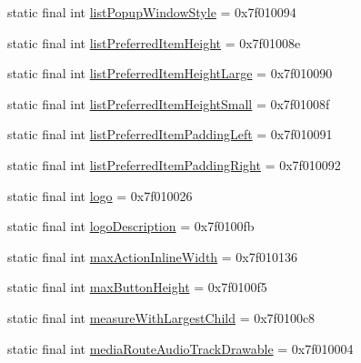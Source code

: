 \begin{CompactItemize}
\item 
static final int \hyperlink{classandroid_1_1support_1_1graphics_1_1drawable_1_1animated_1_1_r_1_1attr_6b8d717596e28632dd77aa2eae804b9a}{listPopupWindowStyle} = 0x7f010094
\item 
static final int \hyperlink{classandroid_1_1support_1_1graphics_1_1drawable_1_1animated_1_1_r_1_1attr_98494be82701302ec81859baf11b7b7b}{listPreferredItemHeight} = 0x7f01008e
\item 
static final int \hyperlink{classandroid_1_1support_1_1graphics_1_1drawable_1_1animated_1_1_r_1_1attr_2771648aa61ad82dc9efb993be87dac1}{listPreferredItemHeightLarge} = 0x7f010090
\item 
static final int \hyperlink{classandroid_1_1support_1_1graphics_1_1drawable_1_1animated_1_1_r_1_1attr_7ee5ac7b3aa22c552ed6161e5c567f4c}{listPreferredItemHeightSmall} = 0x7f01008f
\item 
static final int \hyperlink{classandroid_1_1support_1_1graphics_1_1drawable_1_1animated_1_1_r_1_1attr_1a60e0ab3ddb07bbd0e96ec6a4e09eee}{listPreferredItemPaddingLeft} = 0x7f010091
\item 
static final int \hyperlink{classandroid_1_1support_1_1graphics_1_1drawable_1_1animated_1_1_r_1_1attr_766d436f45af99a902b627c8639fa0e0}{listPreferredItemPaddingRight} = 0x7f010092
\item 
static final int \hyperlink{classandroid_1_1support_1_1graphics_1_1drawable_1_1animated_1_1_r_1_1attr_c8255f8e011683cb6baaf8c1ab0e6345}{logo} = 0x7f010026
\item 
static final int \hyperlink{classandroid_1_1support_1_1graphics_1_1drawable_1_1animated_1_1_r_1_1attr_a13f8ec0564df299b893e1c6cf16a340}{logoDescription} = 0x7f0100fb
\item 
static final int \hyperlink{classandroid_1_1support_1_1graphics_1_1drawable_1_1animated_1_1_r_1_1attr_121d77b74b7427e1ce43a4c64f4331a2}{maxActionInlineWidth} = 0x7f010136
\item 
static final int \hyperlink{classandroid_1_1support_1_1graphics_1_1drawable_1_1animated_1_1_r_1_1attr_fbcb41118a5ba87d39300332ac693deb}{maxButtonHeight} = 0x7f0100f5
\item 
static final int \hyperlink{classandroid_1_1support_1_1graphics_1_1drawable_1_1animated_1_1_r_1_1attr_679804194222ed3dea56c7741d4c6205}{measureWithLargestChild} = 0x7f0100c8
\item 
static final int \hyperlink{classandroid_1_1support_1_1graphics_1_1drawable_1_1animated_1_1_r_1_1attr_7b6a23253225f2b04e501c0f3eb58960}{mediaRouteAudioTrackDrawable} = 0x7f010004

\end{CompactItemize}
